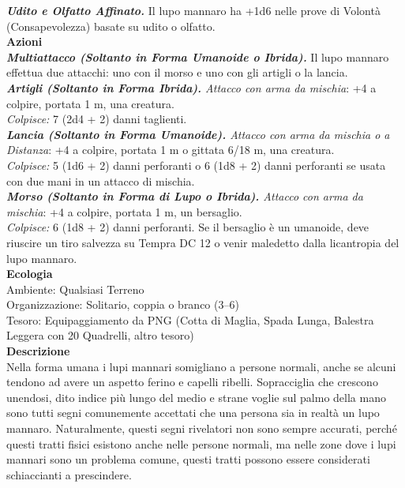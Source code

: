 \begin{multicols}{2}
\emph{\textbf{Udito e Olfatto Affinato.}} Il lupo mannaro ha +1d6 nelle prove di Volontà (Consapevolezza) basate su udito o olfatto.\\
\smallskip\textbf{Azioni}\\

\emph{\textbf{Multiattacco (Soltanto in Forma Umanoide o Ibrida).}} Il lupo mannaro effettua due attacchi: uno con il morso e uno con gli artigli o la lancia.\\
\emph{\textbf{Artigli (Soltanto in Forma Ibrida).} Attacco con arma da mischia}: +4 a colpire, portata 1 m, una creatura.\\
\emph{Colpisce:} 7 (2d4 + 2) danni taglienti.\\

\emph{\textbf{Lancia (Soltanto in Forma Umanoide).} Attacco con arma da mischia o a Distanza}: +4 a colpire, portata 1 m o gittata 6/18 m, una creatura.\\

\emph{Colpisce:} 5 (1d6 + 2) danni perforanti o 6 (1d8 + 2) danni perforanti se usata con due mani in un attacco di mischia.\\

\emph{\textbf{Morso (Soltanto in Forma di Lupo o Ibrida).} Attacco con arma da mischia}: +4 a colpire, portata 1 m, un bersaglio.\\
\emph{Colpisce:} 6 (1d8 + 2) danni perforanti. Se il bersaglio è un umanoide, deve riuscire un tiro salvezza su Tempra DC 12 o venir maledetto dalla licantropia del lupo mannaro.\\
\textbf{Ecologia}\\
Ambiente: Qualsiasi Terreno\\
Organizzazione: Solitario, coppia o branco (3–6)\\
Tesoro: Equipaggiamento da PNG (Cotta di Maglia, Spada Lunga, Balestra Leggera con 20 Quadrelli, altro tesoro)\\
\textbf{Descrizione}\\
Nella forma umana i lupi mannari somigliano a persone normali, anche se alcuni tendono ad avere un aspetto ferino e capelli ribelli. Sopracciglia che crescono unendosi, dito indice più lungo del medio e strane voglie sul palmo della mano sono tutti segni comunemente accettati che una persona sia in realtà un lupo mannaro. Naturalmente, questi segni rivelatori non sono sempre accurati, perché questi tratti fisici esistono anche nelle persone normali, ma nelle zone dove i lupi mannari sono un problema comune, questi tratti possono essere considerati schiaccianti a prescindere.\\


\end{multicols}
